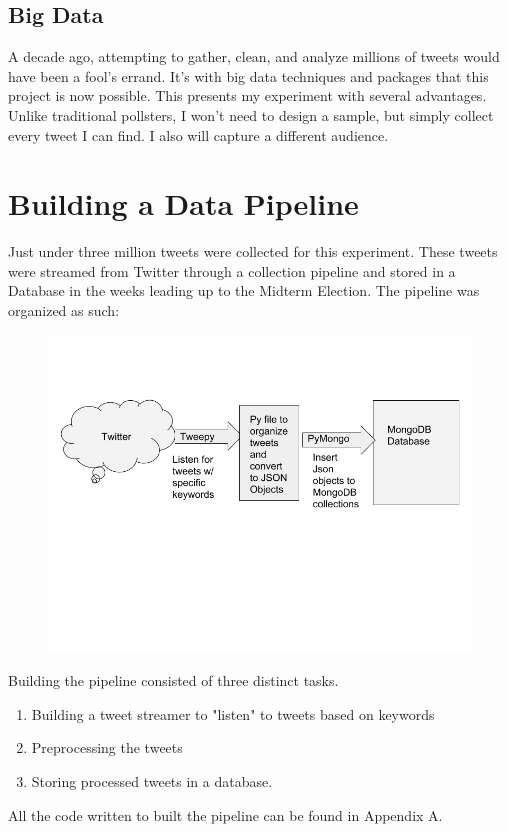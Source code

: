 \documentclass[11pt, twoside, reqno]{book}
\begin{document}
\section{Big Data}
\hspace{0.2in}A decade ago, attempting to gather, clean, and analyze millions of tweets would have been a fool's errand. It's with big data techniques and packages that this project is now possible. This presents my experiment with several advantages. Unlike traditional pollsters, I won't need to design a sample, but simply collect every tweet I can find. I also will capture a different audience. 




\chapter{Building a Data Pipeline}
\label{Ch:2}
\hspace{0.2in} Just under three million tweets were collected for this experiment. These tweets were streamed from Twitter through a collection pipeline and stored in a Database in the weeks leading up to the Midterm Election. The pipeline was organized as such:

\begin{figure}[h]
	\includegraphics[scale=0.5]{data_collection}
\end{figure}

Building the pipeline consisted of three distinct tasks. 
\begin{enumerate}
	\item Building a tweet streamer to "listen" to tweets based on keywords
	\item Preprocessing the tweets
	\item Storing processed tweets in a database. 
\end{enumerate}
All the code written to built the pipeline can be found in Appendix A.
\end{document}
